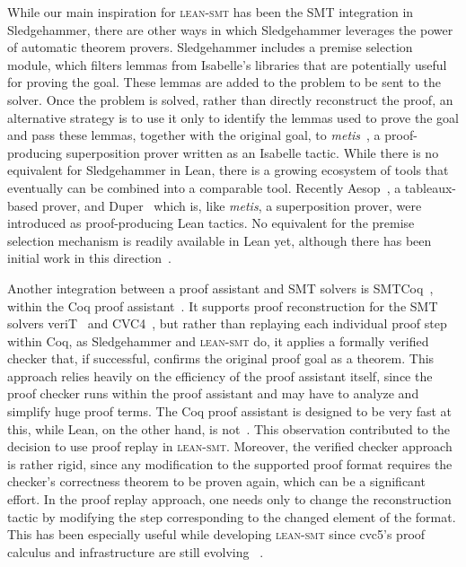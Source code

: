 \documentclass[runningheads]{llncs}
\newcommand{\tactic}{\textsc{lean-smt}\xspace}
\begin{document}
While our main inspiration for \tactic has been the SMT integration in
Sledgehammer, there are other ways in which Sledgehammer leverages the power of
automatic theorem provers.
%
Sledgehammer includes a premise selection module, which filters lemmas from
Isabelle's libraries that are potentially useful for proving the goal. These
lemmas are added to the problem to be sent to the solver.
%
Once the problem is solved, rather than directly reconstruct the proof, an
alternative strategy is to use it only to identify the lemmas used to prove the goal
and pass these lemmas, together with the original goal, to
\emph{metis}~\cite{metis}, a proof-producing superposition prover written as an
Isabelle tactic.
%
While there is no equivalent for Sledgehammer in Lean, there is a growing
ecosystem of tools that eventually can be combined into a comparable tool.
%
Recently Aesop~\cite{aesop}, a tableaux-based prover, and Duper~\cite{duper}
which is, like \emph{metis}, a superposition prover, were introduced as
proof-producing Lean tactics.
%
No equivalent for the premise selection mechanism is readily available in Lean yet,
although there has been initial work in this direction~\cite{premiseSelection}.

Another integration between a proof assistant and SMT solvers is
SMTCoq~\cite{smtcoq}, within the Coq proof assistant~\cite{coq}.
%
It supports proof reconstruction for the SMT solvers veriT~\cite{verit} and
CVC4~\cite{cvc4}, but rather than replaying each individual proof step within
Coq, as Sledgehammer and \tactic do, it applies a formally verified checker
that, if successful, confirms the original proof goal as a theorem.
%
This approach relies heavily on the efficiency of the proof assistant itself,
since the proof checker runs within the proof assistant and
may have to analyze and simplify huge proof terms. The Coq proof assistant is designed to
be very fast at this, while Lean, on the other hand, is not~\cite{baanenPhd}.
This observation contributed to the decision to use proof replay in
\tactic.
%
Moreover, the verified checker approach is rather rigid, since any modification
to the supported proof format requires the checker's correctness theorem to
be proven again, which can be a significant effort.
%
In the proof replay approach, one needs only to change the reconstruction tactic
by modifying the step corresponding to the changed element of the format.
%
This has been especially useful while developing \tactic since cvc5's proof
calculus and infrastructure are still evolving
~\cite{Barbosa2022,Notzli2022,Lachnitt2024}.
%
\end{document}
